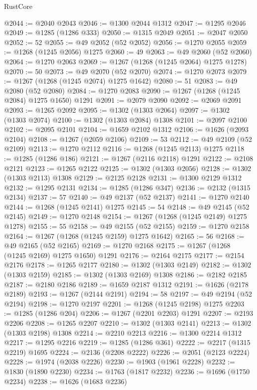 \begin{lexlean}{RustCore}
\begin{coremodule}
@2044 := @2040 @2043
@2046 := @1300 @2044 @1312
@2047 := @1295 @2046
@2049 := @1285 (@1286 @333)
@2050 := @1315 @2049
@2051 := @2047 @2050
@2052 := 52
@2055 := @49 @2052 (@52 @2052)
@2056 := @1270 @2055
@2059 := @1268 (@1245 @2056) @1275
@2060 := 49
@2063 := @49 @2060 (@52 @2060)
@2064 := @1270 @2063
@2069 := @1267 (@1268 (@1245 @2064) @1275 @1278)
@2070 := 50
@2073 := @49 @2070 (@52 @2070)
@2074 := @1270 @2073
@2079 := @1267 (@1268 (@1245 @2074) @1275 @1642)
@2080 := 51
@2083 := @49 @2080 (@52 @2080)
@2084 := @1270 @2083
@2090 := @1267 (@1268 (@1245 @2084) @1275 @1650) @1291
@2091 := @2079 @2090
@2092 := @2069 @2091
@2093 := @1265 @2092
@2095 := @1302 (@1303 @2064)
@2097 := @1302 (@1303 @2074)
@2100 := @1302 (@1303 @2084) @1308
@2101 := @2097 @2100
@2102 := @2095 @2101
@2104 := @1659 @2102 @1312
@2106 := @1626 (@2093 @2104)
@2108 := @1267 (@2059 @2106)
@2109 := 53
@2112 := @49 @2109 (@52 @2109)
@2113 := @1270 @2112
@2116 := @1268 (@1245 @2113) @1275
@2118 := @1285 (@1286 @186)
@2121 := @1267 (@2116 @2118) @1291
@2122 := @2108 @2121
@2123 := @1265 @2122
@2125 := @1302 (@1303 @2056)
@2128 := @1302 (@1303 @2113) @1308
@2129 := @2125 @2128
@2131 := @1300 @2129 @1312
@2132 := @1295 @2131
@2134 := @1285 (@1286 @347)
@2136 := @2132 (@1315 @2134)
@2137 := 57
@2140 := @49 @2137 (@52 @2137)
@2141 := @1270 @2140
@2144 := @1268 (@1245 @2141) @1275
@2145 := 54
@2148 := @49 @2145 (@52 @2145)
@2149 := @1270 @2148
@2154 := @1267 (@1268 (@1245 @2149) @1275 @1278)
@2155 := 55
@2158 := @49 @2155 (@52 @2155)
@2159 := @1270 @2158
@2164 := @1267 (@1268 (@1245 @2159) @1275 @1642)
@2165 := 56
@2168 := @49 @2165 (@52 @2165)
@2169 := @1270 @2168
@2175 := @1267 (@1268 (@1245 @2169) @1275 @1650) @1291
@2176 := @2164 @2175
@2177 := @2154 @2176
@2178 := @1265 @2177
@2180 := @1302 (@1303 @2149)
@2182 := @1302 (@1303 @2159)
@2185 := @1302 (@1303 @2169) @1308
@2186 := @2182 @2185
@2187 := @2180 @2186
@2189 := @1659 @2187 @1312
@2191 := @1626 (@2178 @2189)
@2193 := @1267 (@2144 @2191)
@2194 := 58
@2197 := @49 @2194 (@52 @2194)
@2198 := @1270 @2197
@2201 := @1268 (@1245 @2198) @1275
@2203 := @1285 (@1286 @204)
@2206 := @1267 (@2201 @2203) @1291
@2207 := @2193 @2206
@2208 := @1265 @2207
@2210 := @1302 (@1303 @2141)
@2213 := @1302 (@1303 @2198) @1308
@2214 := @2210 @2213
@2216 := @1300 @2214 @1312
@2217 := @1295 @2216
@2219 := @1285 (@1286 @361)
@2222 := @2217 (@1315 @2219) @1695
@2224 := @2136 (@2208 @2222)
@2226 := @2051 (@2123 @2224)
@2228 := @1974 (@2038 @2226)
@2230 := @1903 (@1961 @2228)
@2232 := @1830 (@1890 @2230)
@2234 := @1763 (@1817 @2232)
@2236 := @1696 (@1750 @2234)
@2238 := @1626 (@1683 @2236)

\end{coremodule}
\end{lexlean}
